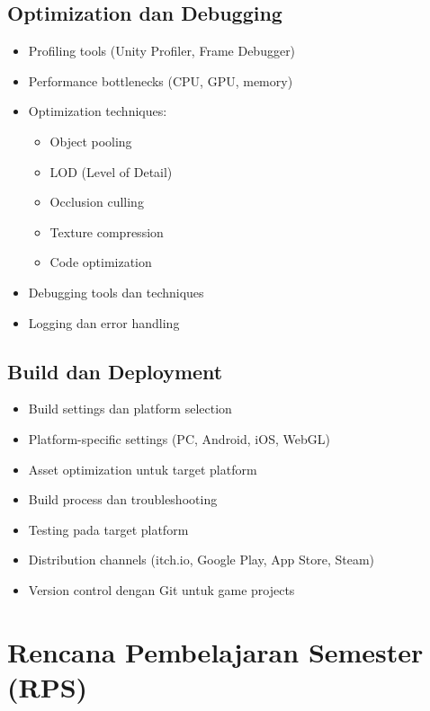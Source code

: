 \documentclass[a4paper,12pt]{article}
\begin{document}
\subsection{Optimization dan Debugging}
\begin{itemize}
\item Profiling tools (Unity Profiler, Frame Debugger)
\item Performance bottlenecks (CPU, GPU, memory)
\item Optimization techniques:
\begin{itemize}
\item Object pooling
\item LOD (Level of Detail)
\item Occlusion culling
\item Texture compression
\item Code optimization
\end{itemize}
\item Debugging tools dan techniques
\item Logging dan error handling
\end{itemize}

\subsection{Build dan Deployment}
\begin{itemize}
\item Build settings dan platform selection
\item Platform-specific settings (PC, Android, iOS, WebGL)
\item Asset optimization untuk target platform
\item Build process dan troubleshooting
\item Testing pada target platform
\item Distribution channels (itch.io, Google Play, App Store, Steam)
\item Version control dengan Git untuk game projects
\end{itemize}

\section{Rencana Pembelajaran Semester (RPS)}
\end{document}
